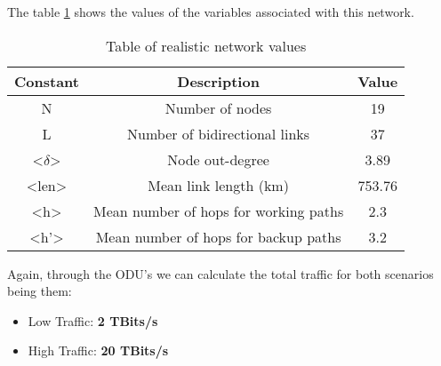 The table \ref{table:6} shows the values of the variables associated with this network.
\begin{table}[h!]
\centering
\begin{tabular}{|| c | c | c||}
 \hline
 Constant & Description & Value \\
 \hline\hline
 N & Number of nodes & 19 \\
 L & Number of bidirectional links & 37 \\
 <$\delta$> & Node out-degree & 3.89 \\
 <len> & Mean link length (km) & 753.76 \\
 <h> & Mean number of hops for working paths & 2.3 \\
 <h'> & Mean number of hops for backup paths & 3.2 \\
 \hline
\end{tabular}
\caption{Table of realistic network values}
\label{table:6}
\end{table}

Again, through the ODU's we can calculate the total traffic for both scenarios being them:
\begin{itemize}
  \item Low Traffic: \textbf{2 TBits/s}
  \item High Traffic: \textbf{20 TBits/s}
\end{itemize}


